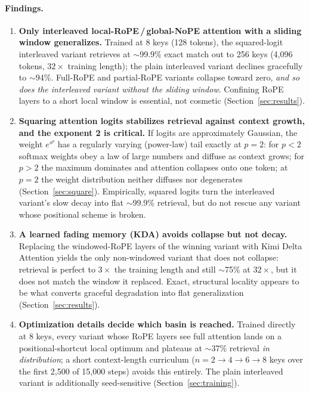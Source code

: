 \documentclass[10pt]{article}
\begin{document}
\paragraph{Findings.}
\begin{enumerate}
  \item \textbf{Only interleaved local-RoPE\,/\,global-NoPE attention with
  a sliding window generalizes.} Trained at 8 keys (128 tokens), the
  squared-logit interleaved variant retrieves at $\sim$99.9\% exact match
  out to 256 keys (4{,}096 tokens, $32\times$ training length); the plain
  interleaved variant declines gracefully to $\sim$94\%. Full-RoPE and
  partial-RoPE variants collapse toward zero, \emph{and so does the
  interleaved variant without the sliding window}. Confining RoPE layers to a short local window is essential, not cosmetic
  (Section~\ref{sec:results}).
  \item \textbf{Squaring attention logits stabilizes retrieval against
  context growth, and the exponent 2 is critical.} If logits are
  approximately Gaussian, the weight $e^{s^p}$ has a regularly varying
  (power-law) tail exactly at $p=2$: for $p<2$ softmax weights obey a law
  of large numbers and diffuse as context grows; for $p>2$ the maximum
  dominates and attention collapses onto one token; at $p=2$ the weight
  distribution neither diffuses nor degenerates
  (Section~\ref{sec:square}). Empirically, squared logits turn the
  interleaved variant's slow decay into flat $\sim$99.9\% retrieval, but
  do not rescue any variant whose positional scheme is broken.
  \item \textbf{A learned fading memory (KDA) avoids collapse but not
  decay.} Replacing the windowed-RoPE layers of the winning variant with
  Kimi Delta Attention \citep{kimiteam2025linear,kimiteam2026k3} yields
  the only non-windowed variant that does not collapse: retrieval is
  perfect to $3\times$ the training length and still $\sim$75\% at
  $32\times$, but it does not match the window it replaced. Exact,
  structural locality appears to be what converts graceful degradation
  into flat generalization (Section~\ref{sec:results}).
  \item \textbf{Optimization details decide which basin is reached.}
  Trained directly at 8 keys, every variant whose RoPE layers see full
  attention lands on a positional-shortcut local optimum and plateaus at
  $\sim$37\% retrieval \emph{in distribution}; a short context-length
  curriculum ($n=2\to4\to6\to8$ keys over the first 2{,}500 of 15{,}000
  steps) avoids this entirely. The plain interleaved variant is
  additionally seed-sensitive (Section~\ref{sec:training}).
\end{enumerate}
\end{document}
